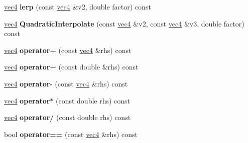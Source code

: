 \begin{DoxyCompactItemize}
\item 
\hypertarget{classmath_1_1vec4_a59bcecf39351f923537ddbe7509abc91}{
\hyperlink{classmath_1_1vec4}{vec4} {\bfseries lerp} (const \hyperlink{classmath_1_1vec4}{vec4} \&v2, double factor) const }
\label{classmath_1_1vec4_a59bcecf39351f923537ddbe7509abc91}

\item 
\hypertarget{classmath_1_1vec4_a9e66ba332b0422401b309f872f68f94b}{
\hyperlink{classmath_1_1vec4}{vec4} {\bfseries QuadraticInterpolate} (const \hyperlink{classmath_1_1vec4}{vec4} \&v2, const \hyperlink{classmath_1_1vec4}{vec4} \&v3, double factor) const }
\label{classmath_1_1vec4_a9e66ba332b0422401b309f872f68f94b}

\item 
\hypertarget{classmath_1_1vec4_a8d6e725e1ea78518947a4d74e946f2fb}{
\hyperlink{classmath_1_1vec4}{vec4} {\bfseries operator+} (const \hyperlink{classmath_1_1vec4}{vec4} \&rhs) const }
\label{classmath_1_1vec4_a8d6e725e1ea78518947a4d74e946f2fb}

\item 
\hypertarget{classmath_1_1vec4_a7d13cbe706c170e99ca08cd7e2e50215}{
\hyperlink{classmath_1_1vec4}{vec4} {\bfseries operator+} (const double \&rhs) const }
\label{classmath_1_1vec4_a7d13cbe706c170e99ca08cd7e2e50215}

\item 
\hypertarget{classmath_1_1vec4_ab35651b388ff6e0b56ccd93a027a5406}{
\hyperlink{classmath_1_1vec4}{vec4} {\bfseries operator-\/} (const \hyperlink{classmath_1_1vec4}{vec4} \&rhs) const }
\label{classmath_1_1vec4_ab35651b388ff6e0b56ccd93a027a5406}

\item 
\hypertarget{classmath_1_1vec4_a1534177755c655a9ba929a3db5d9a515}{
\hyperlink{classmath_1_1vec4}{vec4} {\bfseries operator$\ast$} (const double rhs) const }
\label{classmath_1_1vec4_a1534177755c655a9ba929a3db5d9a515}

\item 
\hypertarget{classmath_1_1vec4_af83111ffad0ff4793eb29b1fadff11a3}{
\hyperlink{classmath_1_1vec4}{vec4} {\bfseries operator/} (const double rhs) const }
\label{classmath_1_1vec4_af83111ffad0ff4793eb29b1fadff11a3}

\item 
\hypertarget{classmath_1_1vec4_ae12bc5fd8ab0fd2db59e88fb419b8d66}{
bool {\bfseries operator==} (const \hyperlink{classmath_1_1vec4}{vec4} \&rhs) const }
\label{classmath_1_1vec4_ae12bc5fd8ab0fd2db59e88fb419b8d66}


\end{DoxyCompactItemize}
